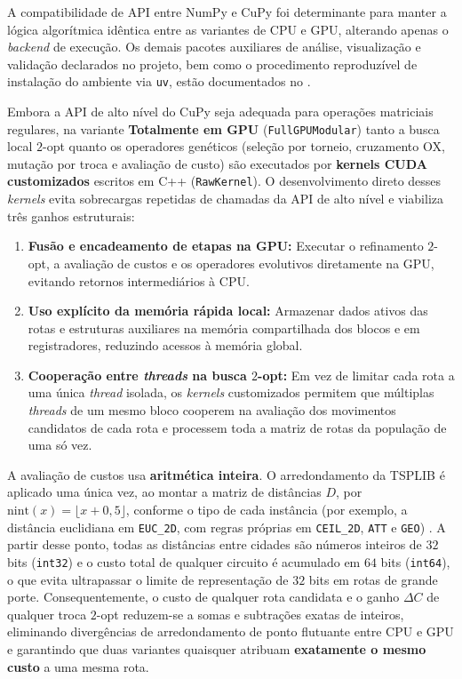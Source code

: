 A compatibilidade de API entre NumPy e CuPy foi determinante para manter a lógica algorítmica idêntica entre as variantes de CPU e GPU, alterando apenas o \emph{backend} de execução.
Os demais pacotes auxiliares de análise, visualização e validação declarados no projeto, bem como o procedimento reproduzível de instalação do ambiente via \texttt{uv}, estão documentados no .

Embora a API de alto nível do CuPy seja adequada para operações matriciais regulares, na variante \textbf{Totalmente em GPU} (\texttt{FullGPUModular}) tanto a busca local \(2\)-opt quanto os operadores genéticos (seleção por torneio, cruzamento OX, mutação por troca e avaliação de custo) são executados por \textbf{kernels CUDA customizados} escritos em C++ (\texttt{RawKernel}).
O desenvolvimento direto desses \emph{kernels} evita sobrecargas repetidas de chamadas da API de alto nível e viabiliza três ganhos estruturais:

\begin{enumerate}
      \item
            \textbf{Fusão e encadeamento de etapas na GPU:} Executar o refinamento \(2\)-opt, a avaliação de custos e os operadores evolutivos diretamente na GPU, evitando retornos intermediários à CPU.
      \item
            \textbf{Uso explícito da memória rápida local:} Armazenar dados ativos das rotas e estruturas auxiliares na memória compartilhada dos blocos e em registradores, reduzindo acessos à memória global.
      \item
            \textbf{Cooperação entre \emph{threads} na busca \(2\)-opt:} Em vez de limitar cada rota a uma única \emph{thread} isolada, os \emph{kernels} customizados permitem que múltiplas \emph{threads} de um mesmo bloco cooperem na avaliação dos movimentos candidatos de cada rota e processem toda a matriz de rotas da população de uma só vez.
\end{enumerate}

A avaliação de custos usa \textbf{aritmética inteira}.
O arredondamento da TSPLIB é aplicado uma única vez, ao montar a matriz de distâncias \(D\), por \(\text{nint}(x) = \lfloor x + 0{,}5 \rfloor\), conforme o tipo de cada instância (por exemplo, a distância euclidiana em \texttt{EUC\_2D}, com regras próprias em \texttt{CEIL\_2D}, \texttt{ATT} e \texttt{GEO}) \autocite{reinelt1991tsplib}.
A partir desse ponto, todas as distâncias entre cidades são números inteiros de \(32\) bits (\texttt{int32}) e o custo total de qualquer circuito é acumulado em \(64\) bits (\texttt{int64}), o que evita ultrapassar o limite de representação de \(32\) bits em rotas de grande porte.
Consequentemente, o custo de qualquer rota candidata e o ganho \(\Delta C\) de qualquer troca \(2\)-opt reduzem-se a somas e subtrações exatas de inteiros, eliminando divergências de arredondamento de ponto flutuante entre CPU e GPU e garantindo que duas variantes quaisquer atribuam \textbf{exatamente o mesmo custo} a uma mesma rota.


